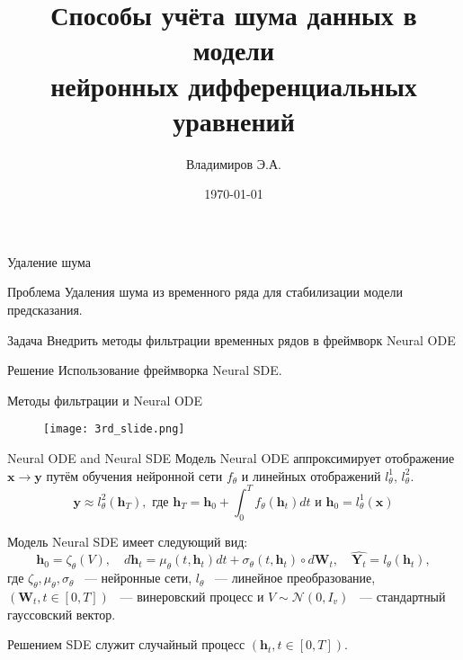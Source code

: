 \documentclass[10pt,pdf,hyperref={unicode}]{beamer}
\title[Заголовок]{Способы учёта шума данных в модели \\ нейронных дифференциальных уравнений}
\author{Владимиров Э.А.}
\institute[]{Московский физико-технический институт}
\date[2022]{\small \today}
\newcommand{\bx}{\mathbf{x}}
\newcommand{\by}{\mathbf{y}}
\newcommand{\bh}{\mathbf{h}}
\newcommand{\bW}{\mathbf{W}}
\newcommand{\bY}{\mathbf{Y}}
\begin{document}
\begin{frame}
\titlepage
\end{frame}

\begin{frame}{Удаление шума}
	\begin{alertblock}{Проблема}
		Удаления шума из временного ряда для стабилизации модели предсказания.
	\end{alertblock}
	
	\begin{alertblock}{Задача}
		Внедрить методы фильтрации временных рядов в фреймворк Neural ODE
	\end{alertblock}
	
	\begin{alertblock}{Решение}
		Использование фреймворка Neural SDE.
	\end{alertblock}
\end{frame}

\begin{frame}{Методы фильтрации и Neural ODE}
	\begin{figure}
		\texttt{[image: 3rd\_slide.png]}
	\end{figure}
\end{frame}

\begin{frame}{Neural ODE and Neural SDE}
	Модель Neural ODE аппроксимирует отображение $\bx \rightarrow \by$ путём обучения нейронной сети $f_\theta$ и линейных отображений $l_\theta^1, \, l_\theta^2$.
	$$ \by \approx l_\theta^2(\bh_T), \text{ где } \bh_T = \bh_0 + \int_{0}^{T} f_\theta(\bh_t) dt \text{ и } \bh_0 = l_\theta^1(\bx)$$
	
	Модель Neural SDE имеет следующий вид:
	$$ \bh_0 = \zeta_\theta(V), \quad d\bh_t = \mu_\theta(t, \bh_t)dt + \sigma_\theta(t, \bh_t) \circ d\bW_t, \quad \widehat{\bY_t} = l_\theta(\bh_t),$$
	где $\zeta_\theta, \mu_\theta, \sigma_\theta$ ~--- нейронные сети, $l_\theta$ ~--- линейное преобразование, $(\bW_t, t \in [0, T])$  ~--- винеровский процесс и $V \sim \mathcal{N}(0, I_v)$ ~--- стандартный гауссовский вектор.
	
	Решением SDE служит случайный процесс $(\bh_t, t \in [0, T])$.
	\bigskip
\end{frame}
\end{document}

